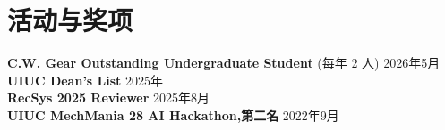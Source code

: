 \section{活动与奖项}
 \begin{itemize}[leftmargin=0.15in, label={}]
    \small{\item{
        \textbf{C.W. Gear Outstanding Undergraduate Student} (每年 2 人) \hfill 2026年5月\\
        \textbf{UIUC Dean's List} \hfill 2025年 \\
        \textbf{RecSys 2025 Reviewer} \hfill 2025年8月 \\
        \textbf{UIUC MechMania 28 AI Hackathon,第二名} \hfill 2022年9月 \\
    }}
 \end{itemize}
